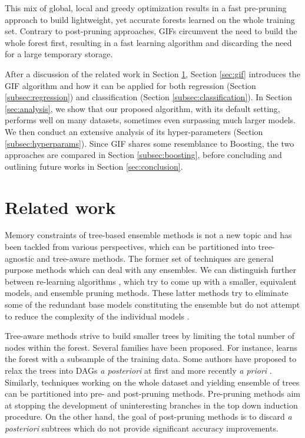 \documentclass{article}
\begin{document}
This mix of global, local and greedy optimization results in a fast pre-pruning 
approach to build lightweight, yet accurate forests learned on the whole 
training set. Contrary to post-pruning approaches, GIFs circumvent the need to 
build the whole forest first, resulting in a fast learning algorithm and 
discarding the need for a large temporary storage.

After a discussion of the related work in Section \ref{sec:relatedWork},
Section \ref{sec:gif} introduces the GIF algorithm and how it can be applied
for both regression (Section \ref{subsec:regression}) and classification
(Section \ref{subsec:classification}).  In Section \ref{sec:analysis}, we show
that our proposed algorithm, with its default setting, performs well
on many datasets, sometimes even surpassing much larger models. We then conduct
an extensive analysis of its hyper-parameters (Section
\ref{subsec:hyperparams}). Since GIF shares some resemblance to Boosting, the
two approaches are compared in Section \ref{subsec:boosting}, before concluding
and outlining future works in Section \ref{sec:conclusion}.


\section{Related work}
\label{sec:relatedWork}
Memory constraints of tree-based ensemble methods is not a new topic and has
been tackled from various perspectives, which can be partitioned into
tree-agnostic and tree-aware methods. The former set of techniques are general
purpose methods which can deal with any ensembles. We can distinguish further
between re-learning algorithms
\citep[e.g.][]{domingos1997oracle,menke2009oracle}, which try to come up with a
smaller, equivalent models, and ensemble pruning methods. These latter methods
try to eliminate some of the redundant base models constituting the ensemble but
do not attempt to reduce the complexity of the individual models \citep[see ][
  for a review of these methods]{tsoumakas2008enspruning,rokach2016enspruning}.

Tree-aware methods strive to build smaller trees by limiting the total number
of nodes within the forest. Several families have been proposed. For instance,
\citet{breiman1999pasting} learns the forest with a subsample of the training
data. Some authors have proposed to relax the trees into DAGs {\it a
  posteriori} at first \citep[e.g.,][]{peterson2009dag} and more recently {\it
  a priori} \cite{shotton2013jungle}.  Similarly, techniques working on the
whole dataset and yielding ensemble of trees can be partitioned into pre- and
post-pruning methods. Pre-pruning methods aim at stopping the development of
uninteresting branches in the top down induction procedure. On the other hand,
the goal of post-pruning methods is to discard {\it a posteriori} subtrees which
do not provide significant accuracy improvements.
\end{document}
